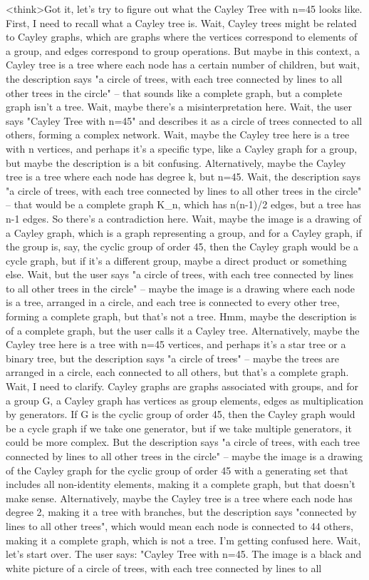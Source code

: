 <think>Got it, let's try to figure out what the Cayley Tree with n=45 looks like. First, I need to recall what a Cayley tree is. Wait, Cayley trees might be related to Cayley graphs, which are graphs where the vertices correspond to elements of a group, and edges correspond to group operations. But maybe in this context, a Cayley tree is a tree where each node has a certain number of children, but wait, the description says "a circle of trees, with each tree connected by lines to all other trees in the circle" – that sounds like a complete graph, but a complete graph isn't a tree. Wait, maybe there's a misinterpretation here. Wait, the user says "Cayley Tree with n=45" and describes it as a circle of trees connected to all others, forming a complex network. Wait, maybe the Cayley tree here is a tree with n vertices, and perhaps it's a specific type, like a Cayley graph for a group, but maybe the description is a bit confusing. Alternatively, maybe the Cayley tree is a tree where each node has degree k, but n=45. Wait, the description says "a circle of trees, with each tree connected by lines to all other trees in the circle" – that would be a complete graph K_n, which has n(n-1)/2 edges, but a tree has n-1 edges. So there's a contradiction here. Wait, maybe the image is a drawing of a Cayley graph, which is a graph representing a group, and for a Cayley graph, if the group is, say, the cyclic group of order 45, then the Cayley graph would be a cycle graph, but if it's a different group, maybe a direct product or something else. Wait, but the user says "a circle of trees, with each tree connected by lines to all other trees in the circle" – maybe the image is a drawing where each node is a tree, arranged in a circle, and each tree is connected to every other tree, forming a complete graph, but that's not a tree. Hmm, maybe the description is of a complete graph, but the user calls it a Cayley tree. Alternatively, maybe the Cayley tree here is a tree with n=45 vertices, and perhaps it's a star tree or a binary tree, but the description says "a circle of trees" – maybe the trees are arranged in a circle, each connected to all others, but that's a complete graph. Wait, I need to clarify. Cayley graphs are graphs associated with groups, and for a group G, a Cayley graph has vertices as group elements, edges as multiplication by generators. If G is the cyclic group of order 45, then the Cayley graph would be a cycle graph if we take one generator, but if we take multiple generators, it could be more complex. But the description says "a circle of trees, with each tree connected by lines to all other trees in the circle" – maybe the image is a drawing of the Cayley graph for the cyclic group of order 45 with a generating set that includes all non-identity elements, making it a complete graph, but that doesn't make sense. Alternatively, maybe the Cayley tree is a tree where each node has degree 2, making it a tree with branches, but the description says "connected by lines to all other trees", which would mean each node is connected to 44 others, making it a complete graph, which is not a tree. I'm getting confused here. Wait, let's start over. The user says: "Cayley Tree with n=45. The image is a black and white picture of a circle of trees, with each tree connected by lines to all 